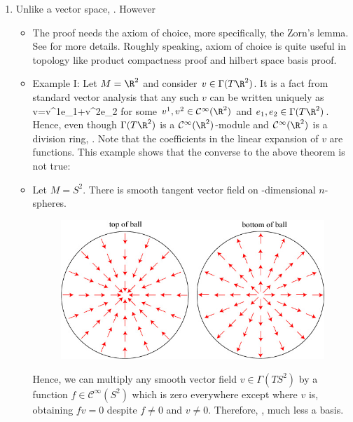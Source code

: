 \documentclass{article}
\begin{document}
\begin{enumerate}
\item {} Unlike a vector space, . However

\centerline{}
\begin{itemize}
    \item The proof needs the axiom of choice, more specifically, the Zorn’s lemma. See \cite{folland1999real} for more details. Roughly speaking, axiom of choice is quite useful in topology like product compactness proof and hilbert space basis proof.
    \item Example I:  Let $M = \R^2$ and consider $v\in \Gamma(T\R^2)$. It is a fact from standard vector analysis that any such $v$ can be written uniquely as
\bse
v=v^1e_1+v^2e_2
\ese
for some $v^1,v^2\in \mathcal{C}^\infty(\R^2)$ and $e_1,e_2\in \Gamma(T\R^2)$. {Hence, even though $\Gamma(T\R^2)$ is a $\mathcal{C}^\infty(\R^2)$-module and $\mathcal{C}^\infty(\R^2)$ is  a division ring, }. Note that the coefficients in the linear expansion of $v$ are functions. This example shows that the converse to the above theorem is not true: 

\item {} Let $M=S^2$. There is  smooth tangent vector field on -dimensional $n$-spheres. 
\begin{figure}[H]
    \centering
    \includegraphics[scale=0.3]{Figs/inoutcomb.jpg}
\end{figure}
Hence, we can multiply any smooth vector field $v\in\Gamma(TS^2)$ by a function $f\in \mathcal{C}^\infty(S^2)$ which is zero everywhere except where $v$ is, obtaining $fv=0$ despite $f\neq 0$ and $v\neq 0$. Therefore, , much less a basis.


\end{itemize}
\end{enumerate}
\end{document}

